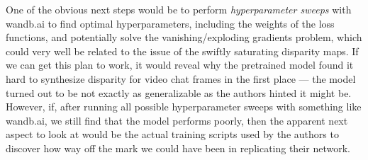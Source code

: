 One of the obvious next steps would be to perform \textit{hyperparameter sweeps} with wandb.ai to find optimal hyperparameters, including the weights of the loss functions, and potentially solve the vanishing/exploding gradients problem, which could very well be related to the issue of the swiftly saturating disparity maps. If we can get this plan to work, it would reveal why the pretrained model found it hard to synthesize disparity for video chat frames in the first place --- the model turned out to be not exactly as generalizable as the authors hinted it might be. However, if, after running all possible hyperparameter sweeps with something like wandb.ai, we still find that the model performs poorly, then the apparent next aspect to look at would be the actual training scripts used by the authors to discover how way off the mark we could have been in replicating their network.


